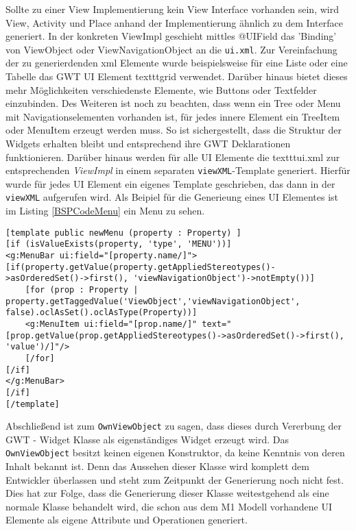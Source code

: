 Sollte zu einer View Implementierung kein View Interface vorhanden sein, wird View, Activity und Place anhand der Implementierung ähnlich zu dem Interface generiert.
In der konkreten ViewImpl geschieht mittles @UIField das 'Binding' von ViewObject oder ViewNavigationObject an die \texttt{ui.xml}. Zur Vereinfachung der zu generierdenden xml Elemente wurde beispielsweise für eine Liste oder eine Tabelle das GWT UI Element texttt{grid} verwendet. Darüber hinaus bietet dieses mehr Möglichkeiten verschiedenste Elemente, wie Buttons oder Textfelder einzubinden. Des Weiteren ist noch zu beachten, dass wenn ein Tree oder Menu mit Navigationselementen vorhanden ist, für jedes innere Element ein TreeItem oder MenuItem erzeugt werden muss. So ist sichergestellt, dass die Struktur der Widgets erhalten bleibt und entsprechend ihre GWT Deklarationen funktionieren.
Darüber hinaus werden für alle UI Elemente die texttt{ui.xml} zur entsprechenden \textit{ViewImpl} in einem separaten \texttt{viewXML}-Template generiert. Hierfür wurde für jedes UI Element ein eigenes Template geschrieben, das dann in der \texttt{viewXML} aufgerufen wird. Als Beipiel für die Generieung  eines UI Elementes ist im Listing \ref{BSPCodeMenu} ein Menu zu sehen.
\lstset{language=OCL}
\begin{lstlisting}[caption={Template für die XML - Generierung eines Menus}, label={BSPCodeMenu}]
[template public newMenu (property : Property) ]
[if (isValueExists(property, 'type', 'MENU'))]
<g:MenuBar ui:field="[property.name/]">
[if(property.getValue(property.getAppliedStereotypes()->asOrderedSet()->first(), 'viewNavigationObject')->notEmpty())]
	[for (prop : Property | property.getTaggedValue('ViewObject','viewNavigationObject', false).oclAsSet().oclAsType(Property))]
	<g:MenuItem ui:field="[prop.name/]" text="[prop.getValue(prop.getAppliedStereotypes()->asOrderedSet()->first(), 'value')/]"/>
	[/for]
[/if]
</g:MenuBar>
[/if]
[/template]
\end{lstlisting}
Abschließend ist zum \texttt{OwnViewObject} zu sagen, dass dieses durch Vererbung der GWT - Widget Klasse als eigenständiges Widget erzeugt wird. Das \texttt{OwnViewObject} besitzt keinen eigenen Konstruktor, da keine Kenntnis von deren Inhalt bekannt ist. Denn das Aussehen dieser Klasse wird komplett dem Entwickler überlassen und steht zum Zeitpunkt der Generierung noch nicht fest. Dies hat zur Folge, dass die Generierung dieser Klasse weitestgehend als eine normale Klasse behandelt wird, die schon aus dem M1 Modell vorhandene UI Elemente als eigene Attribute und Operationen generiert. 
